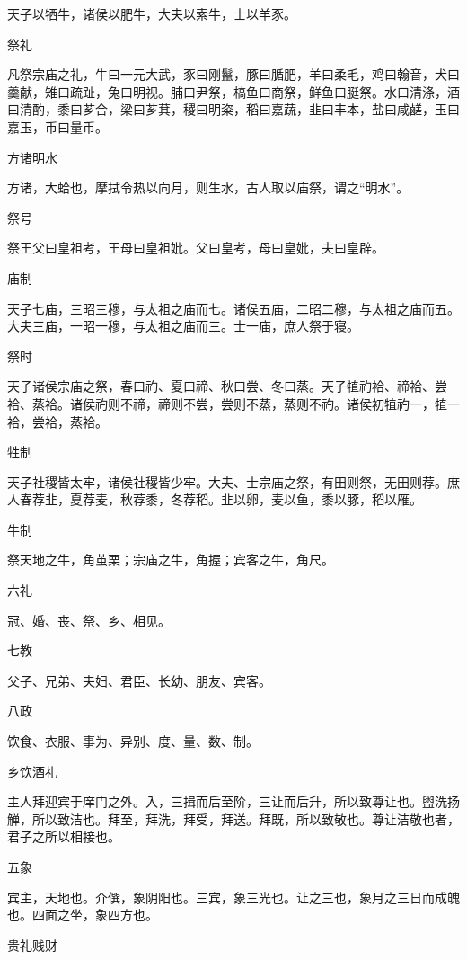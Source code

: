 \documentclass[a4paper,12pt,UTF8,twoside]{ctexbook}
\begin{document}
    天子以牺牛，诸侯以肥牛，大夫以索牛，士以羊豕。
    
    祭礼
    
    凡祭宗庙之礼，牛曰一元大武，豕曰刚鬣，豚曰腯肥，羊曰柔毛，鸡曰翰音，犬曰羹献，雉曰疏趾，兔曰明视。脯曰尹祭，槁鱼曰商祭，鲜鱼曰脡祭。水曰清涤，酒曰清酌，黍曰芗合，梁曰芗萁，稷曰明粢，稻曰嘉蔬，韭曰丰本，盐曰咸鹾，玉曰嘉玉，币曰量币。
    
    方诸明水
    
    方诸，大蛤也，摩拭令热以向月，则生水，古人取以庙祭，谓之“明水”。
    
    祭号
    
    祭王父曰皇祖考，王母曰皇祖妣。父曰皇考，母曰皇妣，夫曰皇辟。
    
    庙制
    
    天子七庙，三昭三穆，与太祖之庙而七。诸侯五庙，二昭二穆，与太祖之庙而五。大夫三庙，一昭一穆，与太祖之庙而三。士一庙，庶人祭于寝。
    
    祭时
    
    天子诸侯宗庙之祭，春曰礿、夏曰禘、秋曰尝、冬曰蒸。天子犆礿袷、禘袷、尝袷、蒸袷。诸侯礿则不禘，禘则不尝，尝则不蒸，蒸则不礿。诸侯初犆礿一，犆一袷，尝袷，蒸袷。
    
    牲制
    
    天子社稷皆太牢，诸侯社稷皆少牢。大夫、士宗庙之祭，有田则祭，无田则荐。庶人春荐韭，夏荐麦，秋荐黍，冬荐稻。韭以卵，麦以鱼，黍以豚，稻以雁。
    
    牛制
    
    祭天地之牛，角茧栗；宗庙之牛，角握；宾客之牛，角尺。
    
    六礼
    
    冠、婚、丧、祭、乡、相见。
    
    七教
    
    父子、兄弟、夫妇、君臣、长幼、朋友、宾客。
    
    八政
    
    饮食、衣服、事为、异别、度、量、数、制。
    
    乡饮酒礼
    
    主人拜迎宾于庠门之外。入，三揖而后至阶，三让而后升，所以致尊让也。盥洗扬觯，所以致洁也。拜至，拜洗，拜受，拜送。拜既，所以致敬也。尊让洁敬也者，君子之所以相接也。
    
    五象
    
    宾主，天地也。介僎，象阴阳也。三宾，象三光也。让之三也，象月之三日而成魄也。四面之坐，象四方也。
    
    贵礼贱财
    
\end{document}

